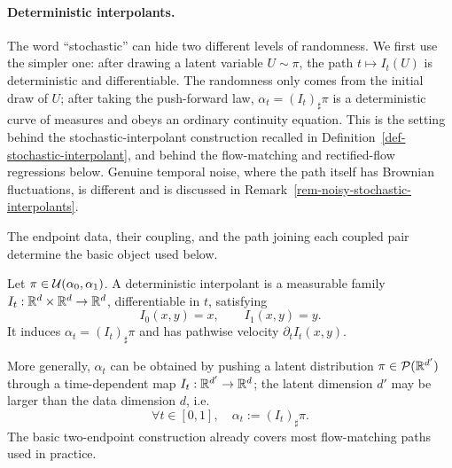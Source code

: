 \paragraph{Deterministic interpolants.}

The word ``stochastic'' can hide two different levels of randomness. We first use the simpler one: after drawing a latent variable $U\sim\pi$, the path $t\mapsto I_t(U)$ is deterministic and differentiable. The randomness only comes from the initial draw of $U$; after taking the push-forward law, $\alpha_t=(I_t)_\sharp\pi$ is a deterministic curve of measures and obeys an ordinary continuity equation. This is the setting behind the stochastic-interpolant construction recalled in Definition~\ref{def-stochastic-interpolant}, and behind the flow-matching and rectified-flow regressions below. Genuine temporal noise, where the path itself has Brownian fluctuations, is different and is discussed in Remark~\ref{rem-noisy-stochastic-interpolants}.

The endpoint data, their coupling, and the path joining each coupled pair determine the basic object used below.
\begin{defn}\label{def-deterministic-interpolant}
Let \(\pi\in\mathcal{U}(\alpha_0,\alpha_1)\). A deterministic interpolant is a measurable family \(I_t:\mathbb{R}^d\times\mathbb{R}^d\to\mathbb{R}^d\), differentiable in $t$, satisfying
\[
	I_0(x,y)=x,
	\qquad
	I_1(x,y)=y.
\]
It induces \(\alpha_t=(I_t)_\sharp\pi\) and has pathwise velocity \(\partial_t I_t(x,y)\).
\end{defn}
More generally, $\alpha_t$ can be obtained by pushing a latent distribution $\pi \in \mathcal{P}(\mathbb{R}^{d'})$ through a time-dependent map $I_t : \mathbb{R}^{d'} \to \mathbb{R}^d$; the latent dimension $d'$ may be larger than the data dimension $d$, i.e.
\begin{equation}\label{eq:interp-coupling}
	\forall t \in [0,1], \quad \alpha_t := (I_t)_\sharp \pi.
\end{equation}
The basic two-endpoint construction already covers most flow-matching paths used in practice.


